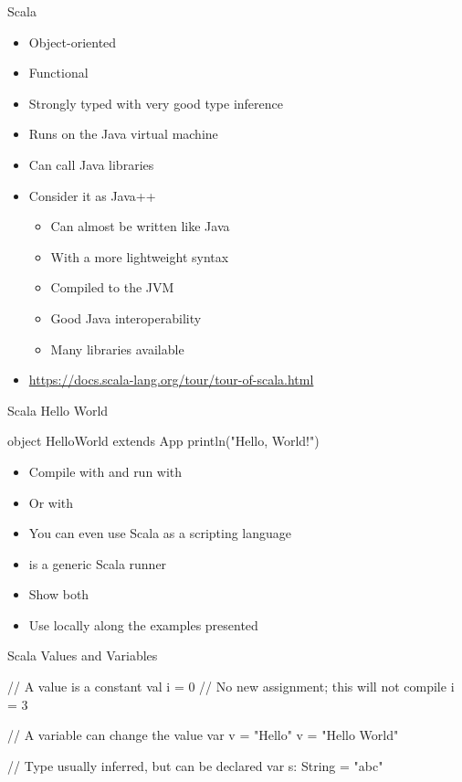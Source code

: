 \begin{frame}[fragile]{Scala}
\begin{itemize}
\item Object-oriented
\item Functional
\item Strongly typed with very good type inference
\item Runs on the Java virtual machine
\item Can call Java libraries
\item Consider it as Java++
\begin{itemize}
\item Can almost be written like Java
\item With a more lightweight syntax
\item Compiled to the JVM
\item Good Java interoperability
\item Many libraries available
\end{itemize}
\item \url{https://docs.scala-lang.org/tour/tour-of-scala.html}
\end{itemize}
\end{frame}

\begin{frame}[fragile]{Scala Hello World}
\begin{chisel}
object HelloWorld extends App {
  println("Hello, World!")
}
\end{chisel}
\begin{itemize}
\item Compile with  and run with 
\item Or with 
\item You can even use Scala as a scripting language
\item {} is a generic Scala runner
\item Show both
\item Use  locally along the examples presented
\end{itemize}
\end{frame}


\begin{frame}[fragile]{Scala Values and Variables}
\begin{chisel}
// A value is a constant
val i = 0
// No new assignment; this will not compile
i = 3

// A variable can change the value
var v = "Hello"
v = "Hello World"

// Type usually inferred, but can be declared
var s: String = "abc"
\end{chisel}
\end{frame}

